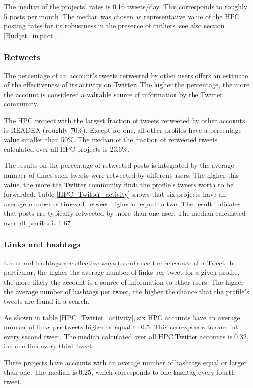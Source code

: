 The median of the projects' rates is 0.16 tweets/day. This corresponds to roughly 5 posts per month. The median was chosen as representative value of the HPC posting rates for its robustness in the presence of outliers, see also section \ref{Budget_impact}.

\subsubsection{Retweets}
The percentage of an account's tweets retweeted by other users offers an estimate of the effectiveness of its activity on Twitter. The higher the percentage, the more the account is considered a valuable source of information by the Twitter community. 

The HPC project with the largest fraction of tweets retweeted by other accounts is READEX (roughly 70\%). Except for one, all other profiles have a percentage value smaller than 50\%. The median of the fraction of retweeted tweets calculated over all HPC projects is 23.6\%.

The results on the percentage of retweeted posts is integrated by the average number of times such tweets were retweeted by different users. The higher this value, the more the Twitter community finds the profile's tweets worth to be forwarded. Table \ref{HPC_Twitter_activity} shows that six projects have an average number of times of retweet higher or equal to two. The result indicates that posts are typically retweeted by more than one user. The median calculated over all profiles is 1.67.

\subsubsection{Links and hashtags}
Links and hashtags are effective ways to enhance the relevance of a Tweet. In particular, the higher the average number of links per tweet for a given profile, the more likely the account is a source of information to other users. The higher the average number of hashtags per tweet, the higher the chance that the profile's tweets are found in a search.

As shown in table \ref{HPC_Twitter_activity}, six HPC accounts have an average number of links per tweets higher or equal to 0.5. This corresponds to one link every second tweet. The median calculated over all HPC Twitter accounts is 0.32, i.e. one link every third tweet. 

Three projects have accounts with an average number of hashtags equal or larger than one. The median is 0.25, which corresponds to one hashtag every fourth tweet.

